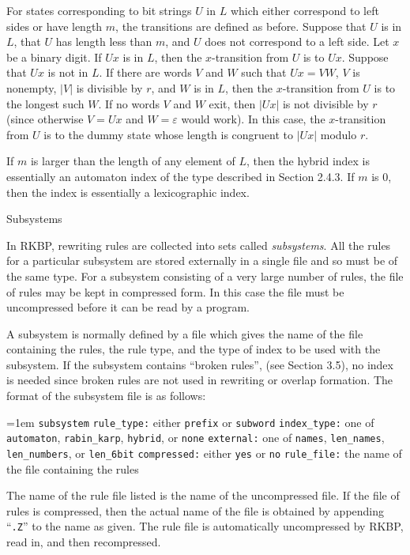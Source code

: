 For states corresponding to bit strings $U$ in $L$ which either
correspond to left sides or have length $m$, the transitions are
defined as before.  Suppose that $U$ is in $L$, that $U$ has length
less than $m$, and $U$ does not correspond to a left side.  Let $x$ be
a binary digit.  If $Ux$ is in $L$, then the $x$-transition from $U$
is to $Ux$.  Suppose that $Ux$ is not in $L$.  If there are words $V$
and $W$ such that $Ux = VW$, $V$ is nonempty, $|V|$ is divisible by
$r$, and $W$ is in $L$, then the $x$-transition from $U$ is to the
longest such $W$.  If no words $V$ and $W$ exit, then $|Ux|$ is not
divisible by $r$ (since otherwise $V = Ux$ and $W = \varepsilon$ would
work).  In this case, the $x$-transition from $U$ is to the dummy state
whose length is congruent to $|Ux|$ modulo $r$.

If $m$ is larger than the length of any element of $L$, then the
hybrid index is essentially an automaton index of the type described
in Section 2.4.3.  If $m$ is 0, then the index is essentially a
lexicographic index.


\bigskip
{} Subsystems

\nobreak

In RKBP, rewriting rules are collected into sets called {\it
subsystems}.  All the rules for a particular subsystem are stored
externally in a single file and so must be of the same type.  For a
subsystem consisting of a very large number of rules, the file of
rules may be kept in compressed form.  In this case the file must be
uncompressed before it can be read by a program.

A subsystem is normally defined by a file which gives the name of the
file containing the rules, the rule type, and the type of index to be
used with the subsystem.  If the subsystem contains ``broken rules'',
(see Section 3.5), no index is needed since broken rules are not used
in rewriting or overlap formation.  The format of the subsystem file
is as follows:

\medskip
{\obeylines \parindent=1em
{\tt subsystem}
{\tt rule\_type:}
either {\tt prefix} or {\tt subword}
{\tt index\_type:}
one of {\tt automaton}, {\tt rabin\_karp}, {\tt hybrid}, or {\tt none}
{\tt external:}
one of {\tt names}, {\tt len\_names}, {\tt len\_numbers}, or {\tt len\_6bit}
{\tt compressed:}
either {\tt yes} or {\tt no}
{\tt rule\_file:}
the name of the file containing the rules
}

\medskip
\noindent The name of the rule file listed is the name of the
uncompressed file.  If the file of rules is compressed, then the
actual name of the file is obtained by appending ``{\tt .Z}'' to the
name as given.  The rule file is automatically uncompressed by RKBP,
read in, and then recompressed.

